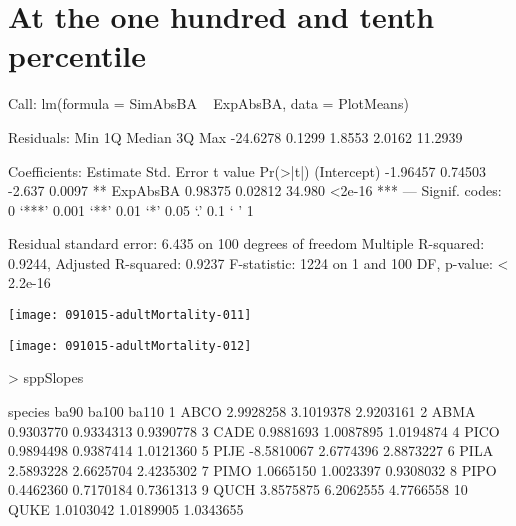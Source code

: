 \documentclass{article}
\begin{document}
\newpage
\section{At the one hundred and tenth percentile}
\begin{Schunk}
\begin{Soutput}
Call:
lm(formula = SimAbsBA ~ ExpAbsBA, data = PlotMeans)

Residuals:
     Min       1Q   Median       3Q      Max 
-24.6278   0.1299   1.8553   2.0162  11.2939 

Coefficients:
            Estimate Std. Error t value Pr(>|t|)    
(Intercept) -1.96457    0.74503  -2.637   0.0097 ** 
ExpAbsBA     0.98375    0.02812  34.980   <2e-16 ***
---
Signif. codes:  0 ‘***’ 0.001 ‘**’ 0.01 ‘*’ 0.05 ‘.’ 0.1 ‘ ’ 1

Residual standard error: 6.435 on 100 degrees of freedom
Multiple R-squared:  0.9244,	Adjusted R-squared:  0.9237 
F-statistic:  1224 on 1 and 100 DF,  p-value: < 2.2e-16
\end{Soutput}
\end{Schunk}
\texttt{[image: 091015-adultMortality-011]}

\texttt{[image: 091015-adultMortality-012]}
\begin{Schunk}
\begin{Sinput}
>   sppSlopes
\end{Sinput}
\begin{Soutput}
   species       ba90     ba100     ba110
1     ABCO  2.9928258 3.1019378 2.9203161
2     ABMA  0.9303770 0.9334313 0.9390778
3     CADE  0.9881693 1.0087895 1.0194874
4     PICO  0.9894498 0.9387414 1.0121360
5     PIJE -8.5810067 2.6774396 2.8873227
6     PILA  2.5893228 2.6625704 2.4235302
7     PIMO  1.0665150 1.0023397 0.9308032
8     PIPO  0.4462360 0.7170184 0.7361313
9     QUCH  3.8575875 6.2062555 4.7766558
10    QUKE  1.0103042 1.0189905 1.0343655
\end{Soutput}
\end{Schunk}






\newpage
\end{document}
